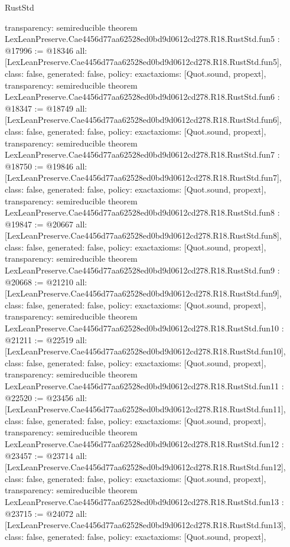\begin{lexlean}{RustStd}
\begin{coremodule}
{  transparency: semireducible
}
theorem LexLeanPreserve.Cae4456d77aa62528ed0bd9d0612cd278.R18.RustStd.fun5 : @17996 := @18346 {
  all: [LexLeanPreserve.Cae4456d77aa62528ed0bd9d0612cd278.R18.RustStd.fun5],
  class: false,
  generated: false,
  policy: exact{axioms: [Quot.sound, propext]},
  transparency: semireducible
}
theorem LexLeanPreserve.Cae4456d77aa62528ed0bd9d0612cd278.R18.RustStd.fun6 : @18347 := @18749 {
  all: [LexLeanPreserve.Cae4456d77aa62528ed0bd9d0612cd278.R18.RustStd.fun6],
  class: false,
  generated: false,
  policy: exact{axioms: [Quot.sound, propext]},
  transparency: semireducible
}
theorem LexLeanPreserve.Cae4456d77aa62528ed0bd9d0612cd278.R18.RustStd.fun7 : @18750 := @19846 {
  all: [LexLeanPreserve.Cae4456d77aa62528ed0bd9d0612cd278.R18.RustStd.fun7],
  class: false,
  generated: false,
  policy: exact{axioms: [Quot.sound, propext]},
  transparency: semireducible
}
theorem LexLeanPreserve.Cae4456d77aa62528ed0bd9d0612cd278.R18.RustStd.fun8 : @19847 := @20667 {
  all: [LexLeanPreserve.Cae4456d77aa62528ed0bd9d0612cd278.R18.RustStd.fun8],
  class: false,
  generated: false,
  policy: exact{axioms: [Quot.sound, propext]},
  transparency: semireducible
}
theorem LexLeanPreserve.Cae4456d77aa62528ed0bd9d0612cd278.R18.RustStd.fun9 : @20668 := @21210 {
  all: [LexLeanPreserve.Cae4456d77aa62528ed0bd9d0612cd278.R18.RustStd.fun9],
  class: false,
  generated: false,
  policy: exact{axioms: [Quot.sound, propext]},
  transparency: semireducible
}
theorem LexLeanPreserve.Cae4456d77aa62528ed0bd9d0612cd278.R18.RustStd.fun10 : @21211 := @22519 {
  all: [LexLeanPreserve.Cae4456d77aa62528ed0bd9d0612cd278.R18.RustStd.fun10],
  class: false,
  generated: false,
  policy: exact{axioms: [Quot.sound, propext]},
  transparency: semireducible
}
theorem LexLeanPreserve.Cae4456d77aa62528ed0bd9d0612cd278.R18.RustStd.fun11 : @22520 := @23456 {
  all: [LexLeanPreserve.Cae4456d77aa62528ed0bd9d0612cd278.R18.RustStd.fun11],
  class: false,
  generated: false,
  policy: exact{axioms: [Quot.sound, propext]},
  transparency: semireducible
}
theorem LexLeanPreserve.Cae4456d77aa62528ed0bd9d0612cd278.R18.RustStd.fun12 : @23457 := @23714 {
  all: [LexLeanPreserve.Cae4456d77aa62528ed0bd9d0612cd278.R18.RustStd.fun12],
  class: false,
  generated: false,
  policy: exact{axioms: [Quot.sound, propext]},
  transparency: semireducible
}
theorem LexLeanPreserve.Cae4456d77aa62528ed0bd9d0612cd278.R18.RustStd.fun13 : @23715 := @24072 {
  all: [LexLeanPreserve.Cae4456d77aa62528ed0bd9d0612cd278.R18.RustStd.fun13],
  class: false,
  generated: false,
  policy: exact{axioms: [Quot.sound, propext]},
}
\end{coremodule}
\end{lexlean}
